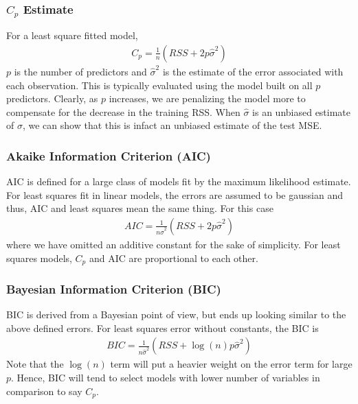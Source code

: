 \documentclass[11pt, a4paper]{article}
\begin{document}
    \subsubsection{$C_{p}$ Estimate}
    For a least square fitted model,
    \begin{align*}
        C_{p} = \frac{1}{n}(RSS + 2p\hat{\sigma}^{2})
    \end{align*}
    $p$ is the number of predictors and $\hat{\sigma}^{2}$ is the estimate of the error associated with each observation. This is typically evaluated using the model built on all $p$ predictors.\newline
    Clearly, as $p$ increases, we are penalizing the model more to compensate for the decrease in the training RSS. When $\hat{\sigma}$ is an unbiased estimate of $\sigma$, we can show that this is infact an unbiased estimate of the test MSE.


    \subsubsection{Akaike Information Criterion (AIC)}
    AIC is defined for a large class of models fit by the maximum likelihood estimate.\newline
    For least squares fit in linear models, the errors are assumed to be gaussian and thus, AIC and least squares mean the same thing. For this case
    \begin{align*}
        AIC = \frac{1}{n\hat{\sigma}^2}(RSS + 2p\hat{\sigma}^2)
    \end{align*}
    where we have omitted an additive constant for the sake of simplicity.\newline
    For least squares models, $C_{p}$ and AIC are proportional to each other.


    \subsubsection{Bayesian Information Criterion (BIC)}
    BIC is derived from a Bayesian point of view, but ends up looking similar to the above defined errors.\newline
    For least squares error without constants, the BIC is
    \begin{align*}
        BIC = \frac{1}{n\hat{\sigma}^{2}} (RSS + \log(n)p\hat{\sigma}^{2})
    \end{align*}
    Note that the $\log(n)$ term will put a heavier weight on the error term for large $p$. Hence, BIC will tend to select models with lower number of variables in comparison to say $C_{p}$.
\end{document}
